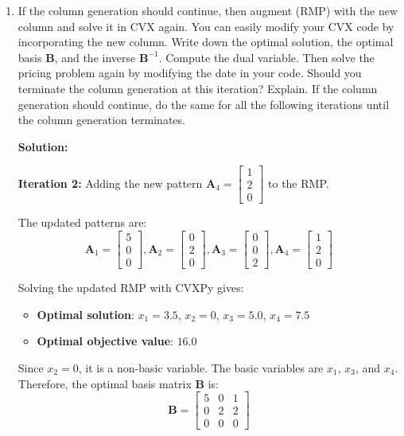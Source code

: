 \documentclass[11pt]{article}
\newcommand{\mb}[1]{\ensuremath{\boldsymbol{#1}}}
\begin{document}
\begin{enumerate}
\begin{enumerate}
\item If the column generation should continue, then augment (RMP) with the new column and solve it in CVX again. You can easily modify your CVX code by incorporating the new column. Write down the optimal solution, the optimal basis $\mb{B}$, and the inverse $\mb{B}^{-1}$. Compute the dual
variable. Then solve the pricing problem again by modifying the date in your code. Should you terminate the column generation at this iteration? Explain. If the column generation should continue, do the same for all the following iterations until the column generation terminates.

\textbf{Solution:}

\textbf{Iteration 2:} Adding the new pattern $\mb{A}_4 = \begin{bmatrix} 1 \\ 2 \\ 0 \end{bmatrix}$ to the RMP.

The updated patterns are:
$$\mb{A}_1 = \begin{bmatrix} 5 \\ 0 \\ 0\end{bmatrix}, \mb{A}_2 = \begin{bmatrix} 0 \\ 2 \\ 0\end{bmatrix}, \mb{A}_3 = \begin{bmatrix} 0 \\ 0 \\2\end{bmatrix}, \mb{A}_4 = \begin{bmatrix} 1 \\ 2 \\ 0\end{bmatrix}$$

Solving the updated RMP with CVXPy gives:
\begin{itemize}
\item \textbf{Optimal solution}: $x_1 = 3.5$, $x_2 = 0$, $x_3 = 5.0$, $x_4 = 7.5$
\item \textbf{Optimal objective value}: $16.0$
\end{itemize}

Since $x_2 = 0$, it is a non-basic variable. The basic variables are $x_1$, $x_3$, and $x_4$. Therefore, the optimal basis matrix $\mb{B}$ is:
$$\mb{B} = \begin{bmatrix} 5 & 0 & 1 \\ 0 & 2 & 2 \\ 0 & 0 & 0 \end{bmatrix}$$


\end{enumerate}
\end{enumerate}
\end{document}
